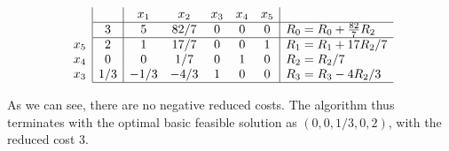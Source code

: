 $$
\begin{array}{c}
\\
\\
x_5\\
x_4 \\
x_3 \\ 
\end{array}
\begin{array}{|c|ccccc|l}
     & x_1 & x_2 & x_3 & x_4 & x_5  \\ \hline
   3 & 5 & 82/7 & 0 & 0 & 0 & R_0 = R_0 + \frac{82}{7}R_2\\ \hline
   2 & 1 & 17/7 & 0  & 0  & 1 & R_1 = R_1 + 17R_2/7\\
   0 & 0 & 1/7 & 0 & 1 & 0  & R_2 = R_2/7\\
   1/3 & -1/3 & -4/3 & 1 & 0 & 0 & R_3 = R_3 - 4R_2/3 \\ \hline
\end{array}
$$

As we can see, there are no negative reduced costs. The algorithm thus terminates with the optimal basic feasible solution as $(0,0,1/3,0,2)$, with the reduced cost $3$.